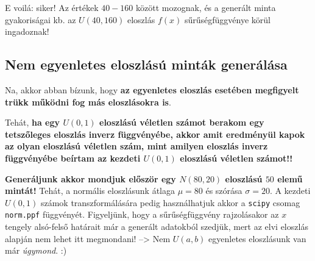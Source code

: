 \documentclass[
]{book}
\begin{document}
E voilá: siker! Az értékek \(40-160\) között mozognak, és a generált minta gyakoriságai kb. az \(U(40,160)\) eloszlás \(f(x)\) sűrűségfüggvénye körül ingadoznak!

\subsection{Nem egyenletes eloszlású minták generálása}\label{nem-egyenletes-eloszluxe1suxfa-mintuxe1k-generuxe1luxe1sa}

Na, akkor abban bízunk, hogy \textbf{az egyenletes eloszlás esetében megfigyelt trükk működni fog más eloszlásokra is}.

Tehát, \textbf{ha egy \(U(0,1)\) eloszlású véletlen számot berakom egy tetszőleges eloszlás inverz függvényébe, akkor amit eredményül kapok az olyan eloszlású véletlen szám, mint amilyen eloszlás inverz függvényébe beírtam az kezdeti \(U(0,1)\) eloszlású véletlen számot!!}

\textbf{Generáljunk akkor mondjuk először egy \(N(80,20)\) eloszlású \(50\) elemű mintát!} Tehát, a normális eloszlásunk átlaga \(\mu=80\) és szórása \(\sigma = 20\). A kezdeti \(U(0,1)\) számok transzformálására pedig használhatjuk akkor a \texttt{scipy} csomag \texttt{norm.ppf} függvényét.
Figyeljünk, hogy a sűrűségfüggvény rajzolásakor az \(x\) tengely alsó-felső határait már a generált adatokból szedjük, mert az elvi eloszlás alapján nem lehet itt megmondani! --\textgreater{} Nem \(U(a,b)\) egyenletes eloszlásunk van már \emph{úgymond}. :)
\end{document}
